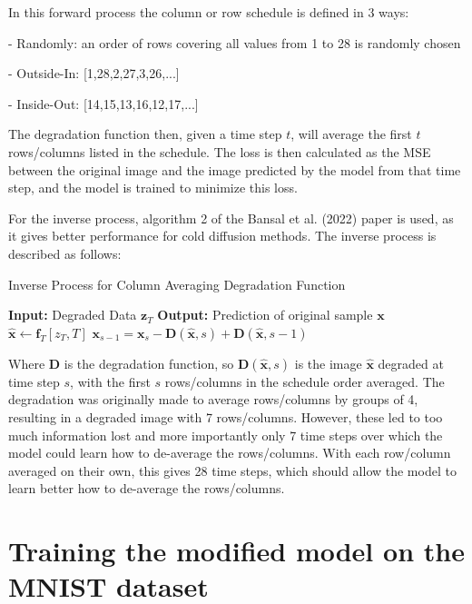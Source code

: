 \documentclass[12pt]{report} %
\begin{document}
In this forward process the column or row schedule is defined in 3 ways:

- Randomly: an order of rows covering all values from 1 to 28 is randomly chosen

- Outside-In: [1,28,2,27,3,26,...]

- Inside-Out: [14,15,13,16,12,17,...]


The degradation function then, given a time step $t$, will average the first $t$ rows/columns listed in the schedule. The loss is then calculated as the MSE between the original image and the image predicted by the model from that time step, and the model is trained to minimize this loss.

For the inverse process, algorithm 2 of the Bansal et al. (2022) paper is used, as it gives better performance for cold diffusion methods\cite[p. 4]{bansal2022cold}. The inverse process is described as follows:

\begin{definitionbox}{Inverse Process for Column Averaging Degradation Function}
  \begin{algorithmic}
    \State \textbf{Input:} Degraded Data $\mathbf{z}_{T}$
    \State \textbf{Output:} Prediction of original sample $\mathbf{x}$
       
        \State $\hat{\mathbf{x}} \gets \mathbf{f}_{T}[z_{T}, T]$ 
        \State $\mathbf{x}_{s-1} = \mathbf{x}_{s} - \mathbf{D}(\hat{\mathbf{x}}, s) + \mathbf{D}(\hat{\mathbf{x}}, s-1)$ 
      \EndFor
  \end{algorithmic}
\end{definitionbox}

Where $\mathbf{D}$ is the degradation function, so $\mathbf{D}(\hat{\mathbf{x}}, s)$ is the image $\hat{\mathbf{x}}$ degraded at time step $s$, with the first $s$ rows/columns in the schedule order averaged. The degradation was originally made to average rows/columns by groups of 4, resulting in a degraded image with 7 rows/columns. However, these led to too much information lost and more importantly only 7 time steps over which the model could learn how to de-average the rows/columns. With each row/column averaged on their own, this gives 28 time steps, which should allow the model to learn better how to de-average the rows/columns.


\section{Training the modified model on the MNIST dataset}
\end{document}
